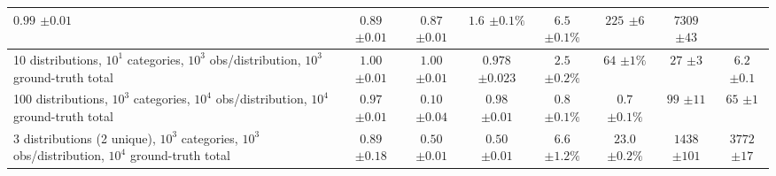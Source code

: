\begin{table*}
\begin{center}
\begin{scriptsize}
\begin{sc}
\begin{tabular}{l||c|c|c||c|c||c|c}
\makecell{$0.99$\\$\pm 0.01$} & \makecell{$0.89$\\$\pm 0.01$} & \makecell{$0.87$\\$\pm 0.01$} & 
\makecell{$1.6$\\$\pm 0.1\%$} & \makecell{$6.5$\\$\pm 0.1\%$} & 
\makecell{$225$\\$\pm 6$} & \makecell{$7309$\\$\pm 43$} \\
\hline
\makecell{10 distributions, $10^1$ categories,\\$10^3$ obs/distribution, $10^3$ ground-truth total} & 
\makecell{$1.00$\\$\pm 0.01$} & \makecell{$1.00$\\$\pm 0.01$} & \makecell{$0.978$\\$\pm 0.023$} & 
\makecell{$2.5$\\$\pm 0.2\%$} & \makecell{$64$\\$\pm 1\%$} & 
\makecell{$27$\\$\pm 3$} & \makecell{$6.2$\\$\pm 0.1$} \\
\hline
\makecell{100 distributions, $10^3$ categories,\\$10^4$ obs/distribution, $10^4$ ground-truth total} & 
\makecell{$0.97$\\$\pm 0.01$} & \makecell{$0.10$\\$\pm 0.04$} & \makecell{$0.98$\\$\pm 0.01$} & 
\makecell{$0.8$\\$\pm 0.1\%$} & \makecell{$0.7$\\$\pm 0.1\%$} & 
\makecell{$99$\\$\pm 11$} & \makecell{$65$\\$\pm 1$} \\
\hline
\makecell{3 distributions (2 unique), $10^3$ categories,\\$10^3$ obs/distribution, $10^4$ ground-truth total} & 
\makecell{$0.89$\\$\pm 0.18$} & \makecell{$0.50$\\$\pm 0.01$} & \makecell{$0.50$\\$\pm 0.01$} & 
\makecell{$6.6$\\$\pm 1.2\%$} & \makecell{$23.0$\\$\pm 0.2\%$} & 
\makecell{$1438$\\$\pm 101$} & \makecell{$3772$\\$\pm 17$} \\

\end{tabular}
\end{sc}
\end{scriptsize}
\end{center}
\end{table*}

